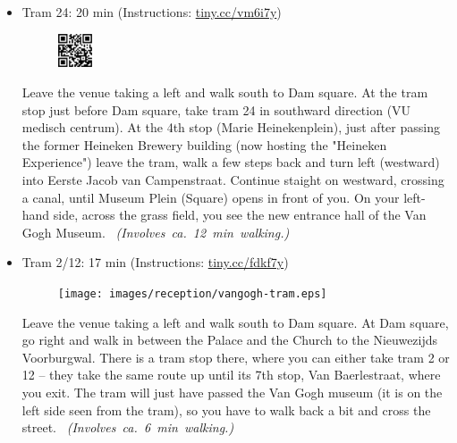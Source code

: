 \begin{itemize}

\item {Tram 24}: \hfill 20 min (Instructions: \url{tiny.cc/vm6i7y})

\begin{minipage}{.9\textwidth}
\begin{figure}
\vspace*{-1.2\baselineskip}%
\includegraphics[width=1cm]{images/reception/vangogh-tram-24.png}
\end{figure}
Leave the venue taking a left and walk south to Dam square. At the tram stop just before Dam square, take tram 24 in southward direction (VU medisch centrum). At the 4th stop (Marie Heinekenplein), just after passing the former Heineken Brewery building (now hosting the "Heineken Experience") leave the tram, walk a few steps back and turn left (westward) into Eerste Jacob van Campenstraat. Continue staight on westward, crossing a canal, until Museum Plein (Square) opens in front of you. On your left-hand side, across the grass field, you see the new entrance hall of the Van Gogh Museum.
~\hspace*{\fill}\mbox{\emph{(Involves ca.\ 12 min walking.)}}
\end{minipage}

\item {Tram 2/12}: \hfill 17 min (Instructions: \url{tiny.cc/fdkf7y})

\begin{minipage}{.9\textwidth}
\begin{figure}
\vspace*{-1.2\baselineskip}%
\texttt{[image: images/reception/vangogh-tram.eps]}
\end{figure}
Leave the venue taking a left and walk south to Dam square. At Dam square, go right and walk in between the Palace and the Church to the Nieuwezijds Voorburgwal. There is a tram stop there, where you can either take tram 2 or 12  -- they take the same route up until its 7th stop, Van Baerlestraat, where you exit. The tram will just have passed the Van Gogh museum (it is on the left side seen from the tram), so you have to walk back a bit and cross the street.
~\hspace*{\fill}\mbox{\emph{(Involves ca.\ 6 min walking.)}}
\end{minipage}

\end{itemize}


